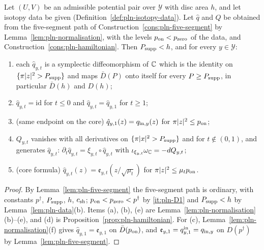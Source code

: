 \begin{theorem}\label{thm:pln-isotopy}
Let $(U,V)$ be an admissible potential pair over $\mathcal Y$ with disc area $h$, and let isotopy data be given
(Definition~\ref{def:pln-isotopy-data}). Let $\hat q$ and $Q$ be obtained from the five-segment path of
Construction~\ref{cons:pln-five-segment} by Lemma~\ref{lem:pln-normalisation}, with the levels $p_{\rm on}<p_{\rm zero}$ of the data,
and Construction~\ref{cons:pln-hamiltonian}. Then $P_{\rm supp}<h$, and for every $y\in\mathcal Y$:
\begin{enumerate}[label=(\alph*)]
\item each $\hat q_{y,t}$ is a symplectic diffeomorphism of $\mathbb{C}$ which is the identity on $\{\pi|z|^2>P_{\rm supp}\}$ and maps
 $\bar D(P)$ onto itself for every $P\ge P_{\rm supp}$, in particular $\bar D(h)$ and $D(h)$;
\item $\hat q_{y,t}=\mathrm{id}$ for $t\le0$ and $\hat q_{y,t}=\hat q_{y,1}$ for $t\ge1$;
\item (same endpoint on the core) $\hat q_{y,1}(z)=q_{{\rm in},y}(z)$ for $\pi|z|^2\le p_{\rm on}$;
\item $Q_{y,t}$ vanishes with all derivatives on $\{\pi|x|^2>P_{\rm supp}\}$ and for $t\notin(0,1)$, and generates $\hat q_{y,t}$:
 $\partial_t\hat q_{y,t}=\xi_{y,t}\circ\hat q_{y,t}$ with $\iota_{\xi_{y,t}}\omega_{\mathbb{C}}=-dQ_{y,t}$;
\item (core formula) $\hat q_{y,t}(z)=\mathfrak e_{y,t}(z/\sqrt{\mu_t})$ for $\pi|z|^2\le\mu_tp_{\rm on}$.
\end{enumerate}
\end{theorem}

\begin{proof}
By Lemma~\ref{lem:pln-five-segment} the five-segment path is ordinary, with constants $p^\dagger$, $P_{\rm supp}$, $h$, $c_{\rm sh}$; $p_{\rm on}<p_{\rm zero}<p^\dagger$ by \ref{it:pln-D1} and $P_{\rm supp}<h$ by Lemma~\ref{lem:pln-data}(b). Items (a), (b), (e) are Lemma~\ref{lem:pln-normalisation}(b)--(e), and (d) is Proposition~\ref{prop:pln-hamiltonian}. For (c), Lemma~\ref{lem:pln-normalisation}(f) gives $\hat q_{y,1}=\mathfrak e_{y,1}$ on $\bar D(p_{\rm on})$, and $\mathfrak e_{y,1}=q^{\rm in}_{y,1}=q_{{\rm in},y}$ on $D(p^\dagger)$ by Lemma~\ref{lem:pln-five-segment}.
\end{proof}


